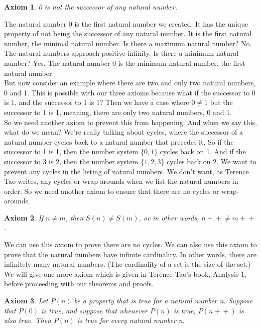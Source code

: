 \documentclass{article}
\newtheorem{axiom}{Axiom}
\newcommand{\inc}[1]{\mathrel{{{#1}+}+}}
\begin{document}
\begin{axiom}
0 is not the successor of any natural number.
\end{axiom}

The natural number 0 is the first natural number we created. It has the unique property of not being the successor of any natural number. It is the first natural number, the minimal natural number. Is there a maximum natural number? No. The natural numbers approach positive infinity. Is there a minimum natural number? Yes. The natural number 0 is the minimum natural number, the first natural number. \\

But now consider an example where there are two and only two natural numbers, 0 and 1. This is possible with our three axioms because what if the successor to 0 is 1, and the successor to 1 is 1? Then we have a case where $0 \neq 1$ but the successor to 1 is 1, meaning, there are only two natural numbers, 0 and 1. \\

So we need another axiom to prevent this from happening. And when we say this, what do we mean? We're really talking about cycles, where the successor of a natural number cycles back to a natural number that precedes it. So if the successor to 1 is 1, then the number system $\{0, 1\}$ cycles back on 1. And if the successor to 3 is 2, then the number system $\{1, 2, 3\}$ cycles back on 2. We want to prevent any cycles in the listing of natural numbers. We don't want, as Terence Tao writes, any cycles or wrap-arounds when we list the natural numbers in order. So we need another axiom to ensure that there are no cycles or wrap-arounds.

\begin{axiom}
If $n \neq m$, then $S(n) \neq S(m)$, or in other words, $\inc{n} \neq \inc{m}$.
\end{axiom}

We can use this axiom to prove there are no cycles. We can also use this axiom to prove that the natural numbers have infinite cardinality. In other words, there are infinitely many natural numbers. (The cardinality of a set is the size of the set.) We will give one more axiom which is given in Terence Tao's book, Analysis-1, before proceeding with our theorems and proofs.

\begin{axiom}
Let $P(n)$ be a property that is true for a natural number n. Suppose that $P(0)$ is true, and suppose that whenever $P(n)$ is true, $P(\inc{n})$ is also true. Then $P(n)$ is true for every natural number n.
\end{axiom}
\end{document}
